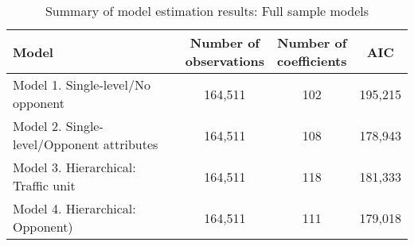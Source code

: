 \documentclass[]{elsarticle} %
\begin{document}
\begin{table}

\caption{\label{tab:model-full-sample-summary}\label{tab:model-full-sample-summary}Summary of model estimation results: Full sample models}
\centering
\fontsize{7}{9}\selectfont
\begin{tabular}[t]{lccc}
\toprule
Model & \makecell[l]{Number of\\observations} & \makecell[l]{Number of\\coefficients} & AIC\\
\midrule
\rowcolor{gray!6}  Model 1. Single-level/No opponent & 164,511 & 102 & 195,215\\
Model 2. Single-level/Opponent attributes & 164,511 & 108 & 178,943\\
\rowcolor{gray!6}  Model 3. Hierarchical: Traffic unit & 164,511 & 118 & 181,333\\
Model 4. Hierarchical: Opponent) & 164,511 & 111 & 179,018\\
\bottomrule
\end{tabular}
\end{table}
\end{document}

